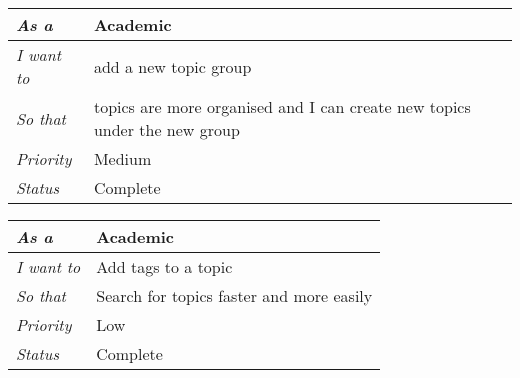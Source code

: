 \begin{table}[h!]
\begin{tabular}{|l|l|}
\hline
\textit{As a}      & Academic                                                                      \\ \hline
\textit{I want to} & add a new topic group                                                     \\ \hline
\textit{So that}   & topics are more organised and I can create new topics under the new group \\ \hline
\textit{Priority}  & {\color[HTML]{F8A102} Medium}                                             \\ \hline
\textit{Status}    & Complete                                                                  \\ \hline
\end{tabular}
\end{table}

\begin{table}[h!]
\begin{tabular}{|l|l|}
\hline
\textit{As a}      & Academic                                 \\ \hline
\textit{I want to} & Add tags to a topic                      \\ \hline
\textit{So that}   & Search for topics faster and more easily \\ \hline
\textit{Priority}  & {\color[HTML]{3531FF} Low}               \\ \hline
\textit{Status}    & Complete                                 \\ \hline
\end{tabular}
\end{table}

